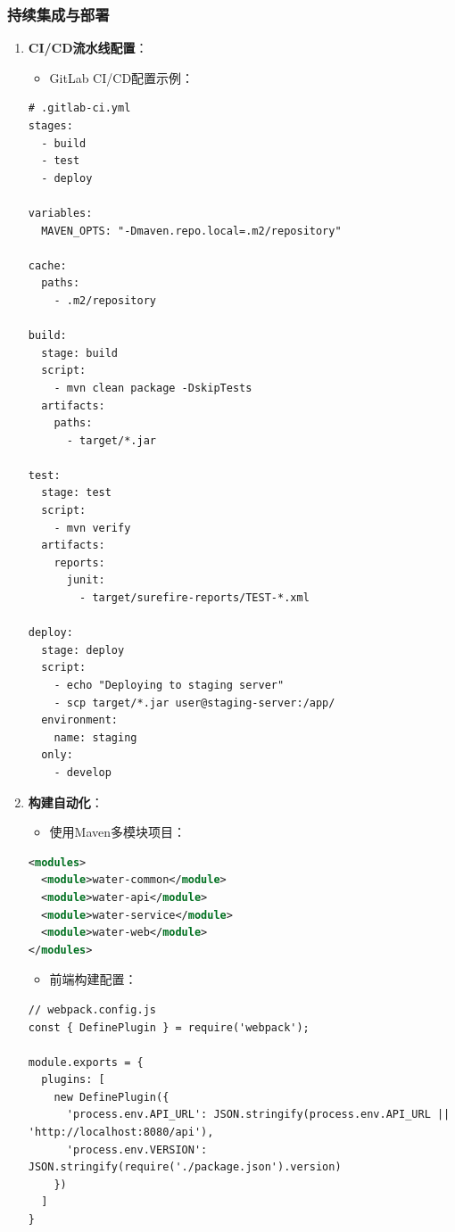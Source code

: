 \subsubsection{持续集成与部署}\label{ux6301ux7eedux96c6ux6210ux4e0eux90e8ux7f72}

\begin{enumerate}
\def\labelenumi{\arabic{enumi}.}
\tightlist
\item
  \textbf{CI/CD流水线配置}：

  \begin{itemize}
  \tightlist
  \item
    GitLab CI/CD配置示例：
  \end{itemize}

\begin{lstlisting}
# .gitlab-ci.yml
stages:
  - build
  - test
  - deploy

variables:
  MAVEN_OPTS: "-Dmaven.repo.local=.m2/repository"

cache:
  paths:
    - .m2/repository

build:
  stage: build
  script:
    - mvn clean package -DskipTests
  artifacts:
    paths:
      - target/*.jar

test:
  stage: test
  script:
    - mvn verify
  artifacts:
    reports:
      junit:
        - target/surefire-reports/TEST-*.xml

deploy:
  stage: deploy
  script:
    - echo "Deploying to staging server"
    - scp target/*.jar user@staging-server:/app/
  environment:
    name: staging
  only:
    - develop
\end{lstlisting}
\item
  \textbf{构建自动化}：

  \begin{itemize}
  \tightlist
  \item
    使用Maven多模块项目：
  \end{itemize}

\begin{lstlisting}[language=XML]
<modules>
  <module>water-common</module>
  <module>water-api</module>
  <module>water-service</module>
  <module>water-web</module>
</modules>
\end{lstlisting}

  \begin{itemize}
  \tightlist
  \item
    前端构建配置：
  \end{itemize}

\begin{lstlisting}
// webpack.config.js
const { DefinePlugin } = require('webpack');

module.exports = {
  plugins: [
    new DefinePlugin({
      'process.env.API_URL': JSON.stringify(process.env.API_URL || 'http://localhost:8080/api'),
      'process.env.VERSION': JSON.stringify(require('./package.json').version)
    })
  ]
}
\end{lstlisting}
\end{enumerate}

